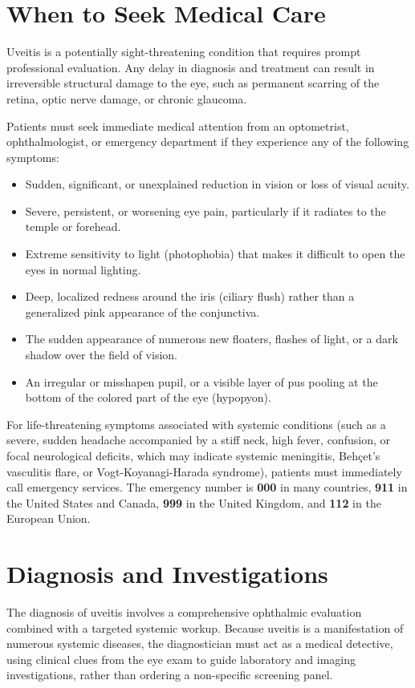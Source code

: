 \section*{When to Seek Medical Care}
Uveitis is a potentially sight-threatening condition that requires prompt professional evaluation. Any delay in diagnosis and treatment can result in irreversible structural damage to the eye, such as permanent scarring of the retina, optic nerve damage, or chronic glaucoma.

Patients must seek immediate medical attention from an optometrist, ophthalmologist, or emergency department if they experience any of the following symptoms:
\begin{itemize}
    \item Sudden, significant, or unexplained reduction in vision or loss of visual acuity.
    \item Severe, persistent, or worsening eye pain, particularly if it radiates to the temple or forehead.
    \item Extreme sensitivity to light (photophobia) that makes it difficult to open the eyes in normal lighting.
    \item Deep, localized redness around the iris (ciliary flush) rather than a generalized pink appearance of the conjunctiva.
    \item The sudden appearance of numerous new floaters, flashes of light, or a dark shadow over the field of vision.
    \item An irregular or misshapen pupil, or a visible layer of pus pooling at the bottom of the colored part of the eye (hypopyon).
\end{itemize}

For life-threatening symptoms associated with systemic conditions (such as a severe, sudden headache accompanied by a stiff neck, high fever, confusion, or focal neurological deficits, which may indicate systemic meningitis, Beh\c{c}et's vasculitis flare, or Vogt-Koyanagi-Harada syndrome), patients must immediately call emergency services. The emergency number is \textbf{000} in many countries, \textbf{911} in the United States and Canada, \textbf{999} in the United Kingdom, and \textbf{112} in the European Union.

\section*{Diagnosis and Investigations}
The diagnosis of uveitis involves a comprehensive ophthalmic evaluation combined with a targeted systemic workup. Because uveitis is a manifestation of numerous systemic diseases, the diagnostician must act as a medical detective, using clinical clues from the eye exam to guide laboratory and imaging investigations, rather than ordering a non-specific screening panel.

